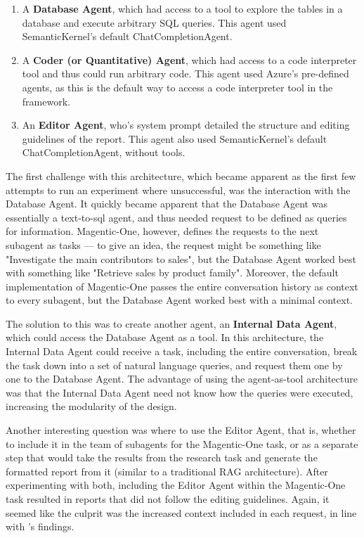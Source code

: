 \documentclass[a4paper]{report}
\begin{document}
\begin{enumerate}
    \item A \textbf{Database Agent}, which had access to a tool to explore the tables in a database and execute arbitrary SQL queries. This agent used SemanticKernel's default ChatCompletionAgent.
    \item A \textbf{Coder (or Quantitative) Agent}, which had access to a code interpreter tool and thus could run arbitrary code. This agent used Azure's pre-defined agents, as this is the default way to access a code interpreter tool in the framework.
    \item An \textbf{Editor Agent}, who's system prompt detailed the structure and editing guidelines of the report. This agent also used SemanticKernel's default ChatCompletionAgent, without tools.
\end{enumerate}

The first challenge with this architecture, which became apparent as the first few attempts to run an experiment where unsuccessful, was the interaction with the Database Agent. It quickly became apparent that the Database Agent was essentially a text-to-sql agent, and thus needed request to be defined as queries for information. Magentic-One, however, defines the requests to the next subagent as tasks --- to give an idea, the request might be something like "Investigate the main contributors to sales", but the Database Agent worked best with something like "Retrieve sales by product family". Moreover, the default implementation of Magentic-One passes the entire conversation history as context to every subagent, but the Database Agent worked best with a minimal context.

The solution to this was to create another agent, an \textbf{Internal Data Agent}, which could access the Database Agent as a tool. In this architecture, the Internal Data Agent could receive a task, including the entire conversation, break the task down into a set of natural language queries, and request them one by one to the Database Agent. The advantage of using the agent-as-tool architecture was that the Internal Data Agent need not know how the queries were executed, increasing the modularity of the design.

Another interesting question was where to use the Editor Agent, that is, whether to include it in the team of subagents for the Magentic-One task, or as a separate step that would take the results from the research task and generate the formatted report from it (similar to a traditional RAG architecture). After experimenting with both, including the Editor Agent within the Magentic-One task resulted in reports that did not follow the editing guidelines. Again, it seemed like the culprit was the increased context included in each request, in line with \cite{veseli2025positionalbiasesshiftinputs}'s findings.
\end{document}
